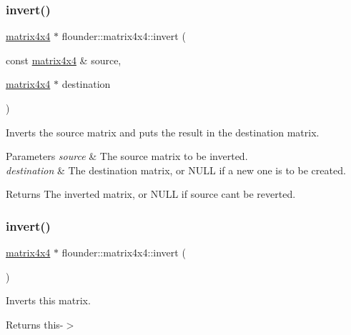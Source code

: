 \subsubsection{\texorpdfstring{invert()}{invert()}\hspace{0.1cm}{\footnotesize\ttfamily [1/2]}}
{\footnotesize\ttfamily \hyperlink{classflounder_1_1matrix4x4}{matrix4x4} $\ast$ flounder\+::matrix4x4\+::invert (\begin{DoxyParamCaption}\item[{const \hyperlink{classflounder_1_1matrix4x4}{matrix4x4} \&}]{source,  }\item[{\hyperlink{classflounder_1_1matrix4x4}{matrix4x4} $\ast$}]{destination }\end{DoxyParamCaption})\hspace{0.3cm}{\ttfamily [static]}}



Inverts the source matrix and puts the result in the destination matrix. 


\begin{DoxyParams}{Parameters}
{\em source} & The source matrix to be inverted. \\
\hline
{\em destination} & The destination matrix, or N\+U\+LL if a new one is to be created. \\
\hline
\end{DoxyParams}
\begin{DoxyReturn}{Returns}
The inverted matrix, or N\+U\+LL if source can\textquotesingle{}t be reverted. 
\end{DoxyReturn}
\mbox{\label{classflounder_1_1matrix4x4_ad8959f0c459bb67eb884806f7303c468}} 
\subsubsection{\texorpdfstring{invert()}{invert()}\hspace{0.1cm}{\footnotesize\ttfamily [2/2]}}
{\footnotesize\ttfamily \hyperlink{classflounder_1_1matrix4x4}{matrix4x4} $\ast$ flounder\+::matrix4x4\+::invert (\begin{DoxyParamCaption}{ }\end{DoxyParamCaption})}



Inverts this matrix. 

\begin{DoxyReturn}{Returns}
this-\/$>$ 
\end{DoxyReturn}
\mbox{\label{classflounder_1_1matrix4x4_a971e94747366db81af609bb97da9b2ed}} 
